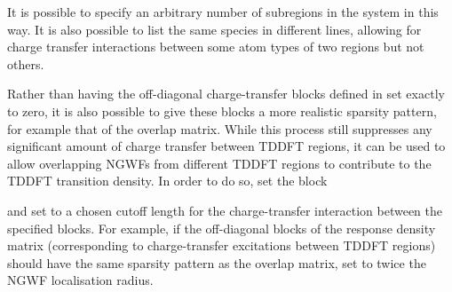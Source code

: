 \documentclass[letterpaper,10pt,english]{sphinxmanual}
\begin{document}
\begin{DUlineblock}{0em}
\item[] It is possible to specify an arbitrary number of subregions in the
system in this way. It is also possible to list the same species in
different lines, allowing for charge transfer interactions between
some atom types of two regions but not others.
\end{DUlineblock}

\begin{DUlineblock}{0em}
\item[] Rather than having the off-diagonal charge-transfer blocks defined in
 set exactly to zero,
it is also possible to give these blocks a more realistic sparsity
pattern, for example that of the overlap matrix. While this process
still suppresses any significant amount of charge transfer between
TDDFT regions, it can be used to allow overlapping NGWFs from
different TDDFT regions to contribute to the TDDFT transition density.
In order to do so, set the block
\end{DUlineblock}

%
\begin{sphinxVerbatim}[commandchars=\\\{\}]
 
    
    
 
\end{sphinxVerbatim}

\begin{DUlineblock}{0em}
\item[] and set  to a chosen cutoff length
for the charge-transfer interaction between the specified blocks. For
example, if the off-diagonal blocks of the response density matrix
(corresponding to charge-transfer excitations between TDDFT regions)
should have the same sparsity pattern as the overlap matrix, set
 to twice the NGWF localisation
radius.
\end{DUlineblock}
\end{document}
